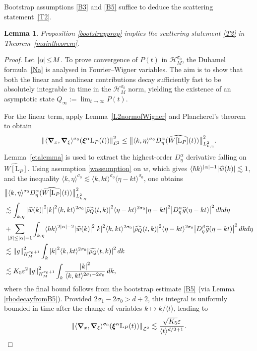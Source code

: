 \documentclass[JEP,XML,SOM,Unicode]{cedram}
\newcommand{\bnorm}[1]{\bigl\|#1\bigr\|}
\theoremstyle{plain}
\newtheorem{lemma}[theorem]{Lemma}
\theoremstyle{remark}
\newcommand{\ak}{\abs{k}}
\newcommand{\aal}{\abs{\alpha}}
\newcommand{\jb}[1]{\langle#1\rangle}
\newcommand{\ep}{\varepsilon}
\begin{document}
Bootstrap assumptions \eqref{B3} and \eqref{B5} suffice to deduce the scattering statement~\eqref{T2}.
\begin{lemma}\label{scatteringlemma}
Proposition \ref{bootstrapprop} implies the scattering statement \eqref{T2} in Theorem~\ref{maintheorem}.
\end{lemma}
\begin{proof}Let $\aal\!\leq\! M$. To prove convergence of $P(t)$ in $\mathcal{H}^{\sigma_0}_M$, the Duhamel formula~\eqref{Na} is analysed in Fourier--Wigner variables. The aim is to show that both the linear and nonlinear contributions decay sufficiently fast to be absolutely integrable in time in the $\mathcal H^{\sigma_0}_M$ norm, yielding the existence of an asymptotic state $Q_\infty := \lim_{t \to \infty} P(t)$.

For the linear term, apply Lemma~\ref{L2normofWigner} and Plancherel's theorem to obtain
\begin{align*}
\norm{\jb{\bm{\nabla}_x,\bm{\nabla}_{\xi}}^{\sigma_0}(\bm{\xi}^\alpha {\mathrm{L}_P}(t))}^2_{\mathcal L^2} \leq \bnorm{\jb{k,\eta}^{\sigma_0} D^\alpha_\eta(\widehat{W[{\mathrm{L}_P}]}(t))}^2_{L^2_{k,\eta}}.
\end{align*}
Lemma~\ref{etalemma} is used to extract the highest-order $D^\alpha_\eta$ derivative falling on $\widehat{W[{\mathrm{L}_P}]}$. Using assumption \eqref{wassumption} on $w$, which gives $\jb{\hbar k}^{\aal - 1} \abs{\widehat{w}(k)} \lesssim 1$, and the inequality $\jb{k,\eta}^{\sigma_0} \lesssim \jb{k,kt}^{\sigma_0} \jb{\eta - kt}^{\sigma_0}$, one obtains
\begin{align*}
&\bnorm{\jb{k,\eta}^{\sigma_0} D^\alpha_\eta(\widehat{W[{\mathrm{L}_P}]}(t))}^2_{L^2_{k,\eta}} \\
&\lesssim \int_{k,\eta} \abs{\widehat{w}(k)}^2 \ak^2 \jb{k,kt}^{2\sigma_0} \abs{\widehat{\rho_Q}(t,k)}^2 \jb{\eta - kt}^{2\sigma_0} \abs{\eta - kt}^2 \abs{D^\alpha_\eta \widehat{g}(\eta - kt)}^2 \,dkd\eta \\
&+ \hspace{-0.25cm}\sum_{\abs{\beta} \leq \aal - 1} \int_{k,\eta} \jb{\hbar k}^{2\aal - 2} \abs{\widehat{w}(k)}^2 \ak^2 \jb{k,kt}^{2\sigma_0} \abs{\widehat{\rho_Q}(t,k)}^2\jb{\eta - kt}^{2\sigma_0} \abs{D^\beta_\eta \widehat{g}(\eta - kt)}^2 \,dkd\eta \\
&\lesssim \norm{g}_{H^{\sigma_0 + 1}_M}^2 \int_k \abs{k}^2 \jb{k,kt}^{2\sigma_0} \abs{\widehat{\rho_Q}(t,k)}^2 \,dk \\
&\lesssim K_5 \ep^2 \norm{g}_{H^{\sigma_0 + 1}_M}^2 \int_k \frac{\abs{k}^2}{\jb{k,kt}^{2\sigma_1 - 2\sigma_0}} \,dk,
\end{align*}
where the final bound follows from the bootstrap estimate \eqref{B5} (via Lemma \ref{rhodecayfromB5}). Provided $2\sigma_1-2\sigma_0>d+2$, this integral is uniformly bounded in time after the change of variables $k\mapsto k/\jb{t}$, leading to
\begin{align*}
\norm{\jb{\bm{\nabla}_x,\bm{\nabla}_{\xi}}^{\sigma_0}(\bm{\xi}^\alpha {\mathrm{L}_P}(t))}_{\mathcal L^2}\lesssim\frac{\sqrt{K_5}\ep}{\jb{t}^{d/2+1}}.
\end{align*}


\end{proof}
\end{document}
